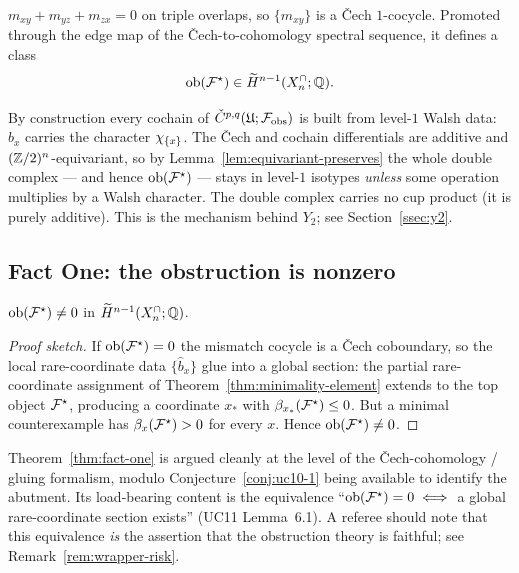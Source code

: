 \begin{lemma}
\label{lem:cocycle}
$m_{xy}+m_{yz}+m_{zx}=0$ on triple overlaps, so $\{m_{xy}\}$ is a
\v{C}ech $1$-cocycle. Promoted through the edge map of the
\v{C}ech-to-cohomology spectral sequence, it defines a class
\[
  \mathrm{ob}(\mathcal{F}^{\star})\in\widetilde H^{n-1}(X^{\cap}_n;\mathbb{Q}).
\]
\end{lemma}

\begin{remark}
\label{rem:source-level1}
By construction every cochain of $\check C^{p,q}(\mathfrak U;\mathcal{F}_{\mathrm{obs}})$ is
built from level-$1$ Walsh data: $\widehat b_x$ carries the character
$\chi_{\{x\}}$. The \v{C}ech and cochain differentials are additive
and $(\mathbb{Z}/2)^n$-equivariant, so by
Lemma~\ref{lem:equivariant-preserves} the whole double complex --- and
hence $\mathrm{ob}(\mathcal{F}^{\star})$ --- stays in level-$1$ isotypes \emph{unless} some
operation multiplies by a Walsh character. The double complex carries
no cup product (it is purely additive). This is the mechanism behind
$Y_2$; see Section~\ref{ssec:y2}.
\end{remark}

\subsection{Fact One: the obstruction is nonzero}
\label{ssec:fact-one}

\begin{theorem}
\label{thm:fact-one}
$\mathrm{ob}(\mathcal{F}^{\star})\neq0$ in $\widetilde H^{n-1}(X^{\cap}_n;\mathbb{Q})$.
\end{theorem}

\begin{proof}[Proof sketch]
If $\mathrm{ob}(\mathcal{F}^{\star})=0$ the mismatch cocycle is a \v{C}ech coboundary, so
the local rare-coordinate data $\{\widehat b_x\}$ glue into a global
section: the partial rare-coordinate assignment of
Theorem~\ref{thm:minimality-element} extends to the top object
$\mathcal{F}^{\star}$, producing a coordinate $x_\ast$ with
$\beta_{x_\ast}(\mathcal{F}^{\star})\le0$. But a minimal counterexample has
$\beta_x(\mathcal{F}^{\star})>0$ for every $x$. Hence $\mathrm{ob}(\mathcal{F}^{\star})\neq0$.
\end{proof}

\begin{status}
Theorem~\ref{thm:fact-one} is argued cleanly at the level of the
\v{C}ech-cohomology / gluing formalism, modulo
Conjecture~\ref{conj:uc10-1} being available to identify the abutment.
Its load-bearing content is the equivalence ``$\mathrm{ob}(\mathcal{F}^{\star})=0\iff$ a
global rare-coordinate section exists'' (UC11 Lemma~6.1). A referee
should note that this equivalence \emph{is} the assertion that the
obstruction theory is faithful; see Remark~\ref{rem:wrapper-risk}.
\end{status}

